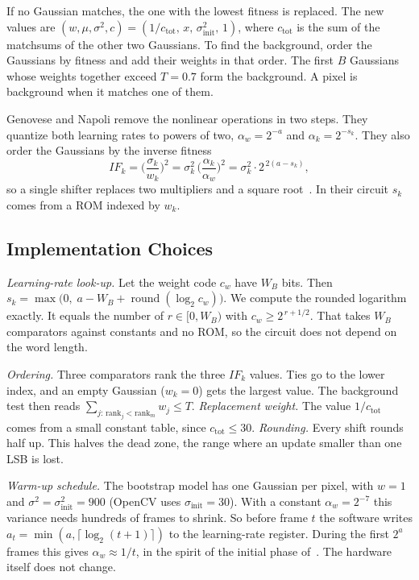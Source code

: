 \documentclass[conference]{IEEEtran}
\begin{document}
If no Gaussian matches, the one with the lowest fitness is replaced. The new
values are $(w,\mu,\sigma^2,c)=(1/c_{\text{tot}},\,x,\,\sigma_{\text{init}}^2,\,1)$,
where $c_{\text{tot}}$ is the sum of the matchsums of the other two Gaussians.
To find the background, order the Gaussians by fitness and add their weights in
that order. The first $B$ Gaussians whose weights together exceed $T=0.7$ form
the background. A pixel is background when it matches one of them.

Genovese and Napoli remove the nonlinear operations in two steps. They quantize
both learning rates to powers of two, $\alpha_w=2^{-a}$ and
$\alpha_k=2^{-s_k}$. They also order the Gaussians by the inverse fitness
\begin{equation}
IF_k = \Big(\frac{\sigma_k}{w_k}\Big)^{2}=\sigma_k^2\,\Big(\frac{\alpha_k}{\alpha_w}\Big)^{2}
=\sigma_k^2\cdot 2^{\,2(a-s_k)} ,
\label{eq:if}
\end{equation}
so a single shifter replaces two multipliers and a square root~\cite{genovese2014}.
In their circuit $s_k$ comes from a ROM indexed by $w_k$.

\subsection{Implementation Choices}
\emph{Learning-rate look-up.} Let the weight code $c_w$ have $W_B$ bits. Then
$s_k=\max\!\big(0,\;a-W_B+\operatorname{round}(\log_2 c_w)\big)$. We compute the
rounded logarithm exactly. It equals the number of $r\in[0,W_B)$ with
$c_w\ge 2^{\,r+1/2}$. That takes $W_B$ comparators against constants and no
ROM, so the circuit does not depend on the word length.

\emph{Ordering.} Three comparators rank the three $IF_k$ values. Ties go to the
lower index, and an empty Gaussian ($w_k=0$) gets the largest value. The
background test then reads $\sum_{j:\,\text{rank}_j<\text{rank}_m} w_j \le T$.
\emph{Replacement weight.} The value $1/c_{\text{tot}}$ comes from a small
constant table, since $c_{\text{tot}}\le 30$. \emph{Rounding.} Every shift rounds
half up. This halves the dead zone, the range where an update smaller than one
LSB is lost.

\emph{Warm-up schedule.} The bootstrap model has one Gaussian per pixel, with
$w=1$ and $\sigma^2=\sigma_{\text{init}}^2=900$ (OpenCV uses
$\sigma_{\text{init}}=30$). With a constant $\alpha_w=2^{-7}$ this variance
needs hundreds of frames to shrink. So before frame $t$ the software writes
$a_t=\min(a,\lceil\log_2(t+1)\rceil)$ to the learning-rate register. During the
first $2^a$ frames this gives $\alpha_w\approx 1/t$, in the spirit of the initial
phase of~\cite{kaew2001}. The hardware itself does not change.
\end{document}
